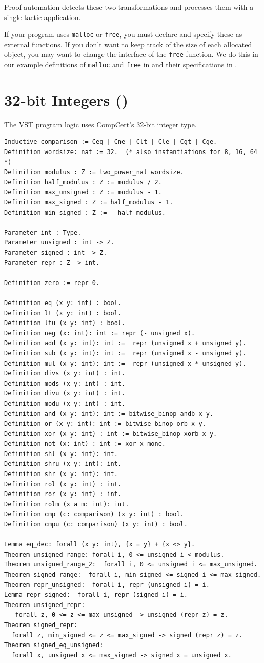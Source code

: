 \documentclass[12pt,fleqn,openany,oneside,showtrims]{memoir}
\newcommand{\ychapter}[2]{\chapter[#1]{#1 \hfill \normalsize #2}}
\begin{document}
Proof automation detects these two transformations and processes them with a
single tactic application.

If your program uses \lstinline|malloc| or \lstinline|free|, you must declare
and specify these as external functions. If you don't want to keep track of the
size of each allocated object, you may want to change the interface of the
\lstinline|free| function. We do this in our example definitions of
\lstinline|malloc| and \lstinline|free| in  and their
specifications in .

\ychapter{32-bit Integers}{()}

The VST program logic uses CompCert's 32-bit integer type.

\begin{lstlisting}
Inductive comparison := Ceq | Cne | Clt | Cle | Cgt | Cge.
Definition wordsize: nat := 32.  (* also instantiations for 8, 16, 64 *)
Definition modulus : Z := two_power_nat wordsize.
Definition half_modulus : Z := modulus / 2.
Definition max_unsigned : Z := modulus - 1.
Definition max_signed : Z := half_modulus - 1.
Definition min_signed : Z := - half_modulus.

Parameter int : Type.
Parameter unsigned : int -> Z.
Parameter signed : int -> Z.
Parameter repr : Z -> int.

Definition zero := repr 0.

Definition eq (x y: int) : bool.
Definition lt (x y: int) : bool.
Definition ltu (x y: int) : bool.
Definition neg (x: int): int := repr (- unsigned x).
Definition add (x y: int): int :=  repr (unsigned x + unsigned y).
Definition sub (x y: int): int :=  repr (unsigned x - unsigned y).
Definition mul (x y: int): int :=  repr (unsigned x * unsigned y).
Definition divs (x y: int) : int.
Definition mods (x y: int) : int.
Definition divu (x y: int) : int.
Definition modu (x y: int) : int.
Definition and (x y: int): int := bitwise_binop andb x y.
Definition or (x y: int): int := bitwise_binop orb x y.
Definition xor (x y: int) : int := bitwise_binop xorb x y.
Definition not (x: int) : int := xor x mone.
Definition shl (x y: int): int.
Definition shru (x y: int): int.
Definition shr (x y: int): int.
Definition rol (x y: int) : int.
Definition ror (x y: int) : int.
Definition rolm (x a m: int): int.
Definition cmp (c: comparison) (x y: int) : bool.
Definition cmpu (c: comparison) (x y: int) : bool.

Lemma eq_dec: forall (x y: int), {x = y} + {x <> y}.
Theorem unsigned_range: forall i, 0 <= unsigned i < modulus.
Theorem unsigned_range_2:  forall i, 0 <= unsigned i <= max_unsigned.
Theorem signed_range:  forall i, min_signed <= signed i <= max_signed.
Theorem repr_unsigned:  forall i, repr (unsigned i) = i.
Lemma repr_signed:  forall i, repr (signed i) = i.
Theorem unsigned_repr: 
   forall z, 0 <= z <= max_unsigned -> unsigned (repr z) = z.
Theorem signed_repr:
  forall z, min_signed <= z <= max_signed -> signed (repr z) = z.
Theorem signed_eq_unsigned:
  forall x, unsigned x <= max_signed -> signed x = unsigned x.


\end{lstlisting}
\end{document}
